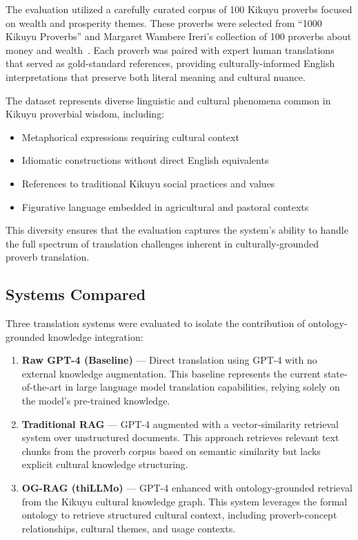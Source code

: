 The evaluation utilized a carefully curated corpus of 100 Kikuyu proverbs focused on wealth and prosperity themes. These proverbs were selected from ``1000 Kikuyu Proverbs'' and Margaret Wambere Ireri's collection of 100 proverbs about money and wealth~\cite{ireri2019}. Each proverb was paired with expert human translations that served as gold-standard references, providing culturally-informed English interpretations that preserve both literal meaning and cultural nuance.

The dataset represents diverse linguistic and cultural phenomena common in Kikuyu proverbial wisdom, including:
\begin{itemize}
    \item Metaphorical expressions requiring cultural context
    \item Idiomatic constructions without direct English equivalents
    \item References to traditional Kikuyu social practices and values
    \item Figurative language embedded in agricultural and pastoral contexts
\end{itemize}

This diversity ensures that the evaluation captures the system's ability to handle the full spectrum of translation challenges inherent in culturally-grounded proverb translation.

\subsection{Systems Compared}

Three translation systems were evaluated to isolate the contribution of ontology-grounded knowledge integration:

\begin{enumerate}
    \item \textbf{Raw GPT-4 (Baseline)} --- Direct translation using GPT-4 with no external knowledge augmentation. This baseline represents the current state-of-the-art in large language model translation capabilities, relying solely on the model's pre-trained knowledge.
    
    \item \textbf{Traditional RAG} --- GPT-4 augmented with a vector-similarity retrieval system over unstructured documents. This approach retrieves relevant text chunks from the proverb corpus based on semantic similarity but lacks explicit cultural knowledge structuring.
    
    \item \textbf{OG-RAG (thiLLMo)} --- GPT-4 enhanced with ontology-grounded retrieval from the Kikuyu cultural knowledge graph. This system leverages the formal ontology to retrieve structured cultural context, including proverb-concept relationships, cultural themes, and usage contexts.
\end{enumerate}

